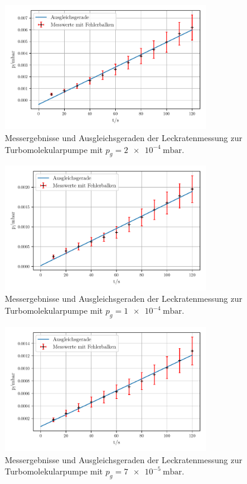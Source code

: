     \begin{figure}
        \centering
        \includegraphics[width=0.8\textwidth]{abb/turbo_leck2e-4.pdf}
        \caption{Messergebnisse und Ausgleichsgeraden der Leckratenmessung zur Turbomolekularpumpe mit $p_g = \qty{2e-4}{\milli\bar}$.}
        \label{fig:turboLeck2}
    \end{figure}

    \begin{figure}
        \centering
        \includegraphics[width=0.8\textwidth]{abb/turbo_leck1e-4.pdf}
        \caption{Messergebnisse und Ausgleichsgeraden der Leckratenmessung zur Turbomolekularpumpe mit $p_g = \qty{1e-4}{\milli\bar}$.}
        \label{fig:turboLeck1}
    \end{figure}

    \begin{figure}
        \centering
        \includegraphics[width=0.8\textwidth]{abb/turbo_leck7e-5.pdf}
        \caption{Messergebnisse und Ausgleichsgeraden der Leckratenmessung zur Turbomolekularpumpe mit $p_g = \qty{7e-5}{\milli\bar}$.}
        \label{fig:turboLeck7}
    \end{figure}

